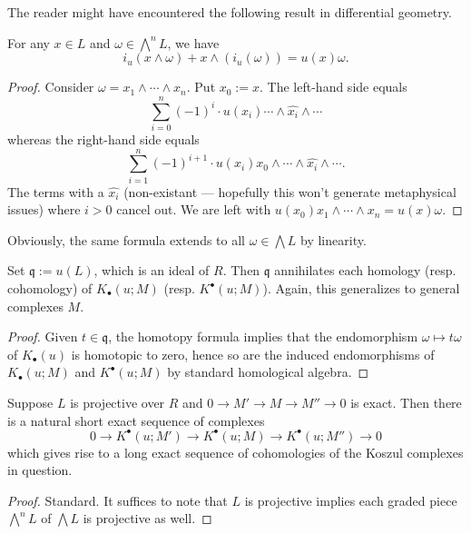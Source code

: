 The reader might have encountered the following result in differential geometry.
\begin{proposition}
	For any $x \in L$ and $\omega \in \bigwedge^n L$, we have
	\[ i_u (x \wedge \omega) + x \wedge (i_u(\omega)) = u(x) \omega. \]
\end{proposition}
\begin{proof}
	Consider $\omega = x_1 \wedge \cdots \wedge x_n$. Put $x_0 := x$. The left-hand side equals
	\[ \sum_{i=0}^n (-1)^i \cdot u(x_i) \cdots \wedge \widehat{x_i} \wedge \cdots  \]
	whereas the right-hand side equals
	\[ \sum_{i=1}^n (-1)^{i+1} \cdot u(x_i) x_0 \wedge \cdots \wedge \widehat{x_i} \wedge \cdots. \]
	The terms with a $\widehat{x_i}$ (non-existant --- hopefully this won't generate metaphysical issues) where $i > 0$ cancel out. We are left with $u(x_0) x_1 \wedge \cdots \wedge x_n = u(x) \omega$.
\end{proof}
Obviously, the same formula extends to all $\omega \in \bigwedge L$ by linearity.

\begin{proposition}\label{prop:Koszul-u-vanishing}
	Set $\mathfrak{q} := u(L)$, which is an ideal of $R$. Then $\mathfrak{q}$ annihilates each homology (resp. cohomology) of $K_\bullet(u; M)$ (resp. $K^\bullet(u; M)$). Again, this generalizes to general complexes $M$.
\end{proposition}
\begin{proof}
	Given $t \in \mathfrak{q}$, the homotopy formula implies that the endomorphism $\omega \mapsto t\omega$ of $K_\bullet(u)$ is homotopic to zero, hence so are the induced endomorphisms of $K_\bullet(u; M)$ and $K^\bullet(u; M)$ by standard homological algebra.
\end{proof}

\begin{proposition}\label{prop:Koszul-long-exact-sequence}
	Suppose $L$ is projective over $R$ and $0 \to M' \to M \to M'' \to 0$ is exact. Then there is a natural short exact sequence of complexes
	\[ 0 \to K^\bullet(u; M') \to K^\bullet(u; M) \to K^\bullet(u; M'') \to 0 \]
	which gives rise to a long exact sequence of cohomologies of the Koszul complexes in question.
\end{proposition}
\begin{proof}
	Standard. It suffices to note that $L$ is projective implies each graded piece $\bigwedge^n L$ of $\bigwedge L$ is projective as well.
\end{proof}

